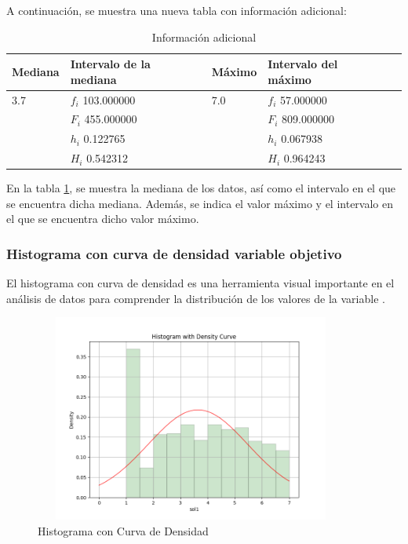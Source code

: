 A continuación, se muestra una nueva tabla con información adicional:

\begin{table}[H]
    \centering
    \caption{Información adicional}
    \begin{tabular}{lllll}
        \hline
        \textbf{Mediana} & \textbf{Intervalo de la mediana} & \textbf{Máximo} & \textbf{Intervalo del máximo} \\
        \hline
        3.7              & $f_i$ 103.000000                 & 7.0             & $f_i$ 57.000000               \\
                         & $F_i$ 455.000000                 &                 & $F_i$ 809.000000              \\
                         & $h_i$ 0.122765                   &                 & $h_i$ 0.067938                \\
                         & $H_i$ 0.542312                   &                 & $H_i$ 0.964243                \\
        \hline
    \end{tabular}%
    \label{tab:informacion_adicional}%
\end{table}%

En la tabla \ref{tab:informacion_adicional}, se muestra la mediana de los datos, así como el intervalo en el que se encuentra dicha mediana. Además, se indica el valor máximo y el intervalo en el que se encuentra dicho valor máximo.

\subsubsection{Histograma con curva de densidad variable objetivo}

El histograma con curva de densidad es una herramienta visual importante en el análisis de datos para comprender la distribución de los valores de la variable .

\begin{figure}[H]
    \centering
    \includegraphics[width=4.06111in,height=2.68611in]{img/histogramaConCurvaDeDensidad.png}
    \caption{Histograma con Curva de Densidad}
    \label{fig:hist_density}%
\end{figure}%


